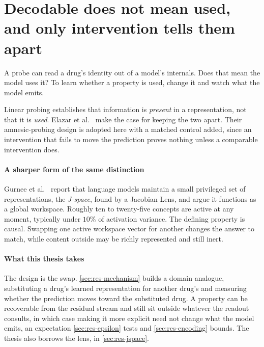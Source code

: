 \section{Decodable does not mean used, and only intervention tells them apart}
\label{sec:lit-interp}
\framedecl{-}

\begin{question}
A probe can read a drug's identity out of a model's internals. Does that mean the
model uses it? To learn whether a property is used, change it and watch what the
model emits.
\end{question}

\noindent
Linear probing establishes that information is \emph{present} in a
representation, not that it is \emph{used}. Elazar et al.~\cite{gurnee} make the
case for keeping the two apart. Their amnesic-probing design is adopted here with
a matched control added, since an intervention that fails to move the prediction
proves nothing unless a comparable intervention does.

\paragraph{A sharper form of the same distinction} Gurnee et al.~\cite{workspace}
report that language models maintain a small privileged set of representations,
the \emph{J-space}, found by a Jacobian Lens, and argue it functions as a global
workspace. Roughly ten to twenty-five concepts are active at any moment,
typically under $10\%$ of activation variance. The defining property is causal.
Swapping one active
workspace vector for another changes the answer to match, while content outside
may be richly represented and still inert.

\paragraph{What this thesis takes} The design is the swap.
\cref{sec:res-mechanism} builds a domain analogue, substituting a drug's learned
representation for another drug's and measuring whether the prediction moves
toward the substituted drug. A property can be recoverable from the residual
stream and still sit outside whatever the readout consults, in which case making
it more explicit need not change what the model emits, an expectation
\cref{sec:res-epsilon} tests and \cref{sec:res-encoding} bounds.
The thesis also borrows the lens, in \cref{sec:res-jspace}.

